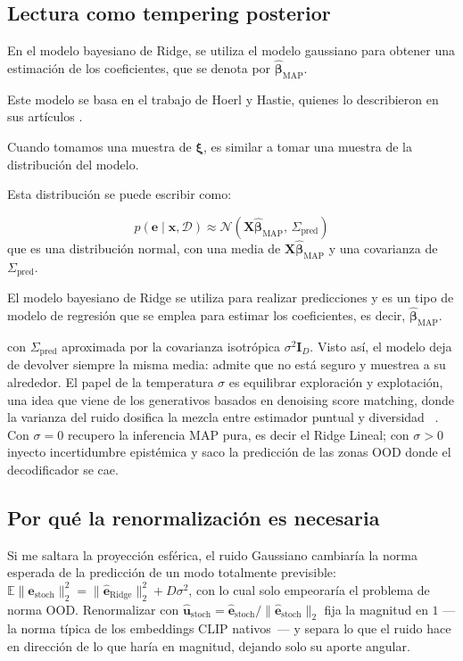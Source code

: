 \subsection{Lectura como tempering posterior}
En el modelo bayesiano de Ridge, se utiliza el modelo gaussiano para obtener una estimación de los coeficientes, que se denota por $\hat{\boldsymbol{\beta}}_{\text{MAP}}$.

Este modelo se basa en el trabajo de Hoerl y Hastie, quienes lo describieron en sus artículos \cite{hoerl1970ridge,hastie2009elements}.

Cuando tomamos una muestra de $\boldsymbol{\xi}$, es similar a tomar una muestra de la distribución del modelo.

Esta distribución se puede escribir como:

\begin{equation}
p(\mathbf{e}\!\mid\!\mathbf{x},\mathcal{D}) \approx \mathcal{N}\!\left(\mathbf{X}\hat{\boldsymbol{\beta}}_{\text{MAP}},\,\Sigma_{\text{pred}}\right)
\end{equation}
que es una distribución normal, con una media de $\mathbf{X}\hat{\boldsymbol{\beta}}_{\text{MAP}}$ y una covarianza de $\Sigma_{\text{pred}}$.

El modelo bayesiano de Ridge se utiliza para realizar predicciones y es un tipo de modelo de regresión que se emplea para estimar los coeficientes, es decir, $\hat{\boldsymbol{\beta}}_{\text{MAP}}$.

con $\Sigma_{\text{pred}}$ aproximada por la covarianza isotrópica $\sigma^2\mathbf{I}_D$. 
Visto así, el modelo deja de devolver siempre la misma media: admite que no está seguro y 
muestrea a su alrededor. El papel de la temperatura $\sigma$ es equilibrar exploración y 
explotación, una idea que viene de los generativos basados en denoising score matching, donde 
la varianza del ruido dosifica la mezcla entre estimador puntual y diversidad
~\cite{sohldickstein2015deep,ho2020ddpm}. Con $\sigma=0$ recupero la inferencia MAP pura, es 
decir el Ridge Lineal; con $\sigma>0$ inyecto incertidumbre epistémica y saco la predicción de 
las zonas OOD donde el decodificador se cae.

\subsection{Por qué la renormalización es necesaria}

Si me saltara la proyección esférica, el ruido Gaussiano cambiaría la norma esperada de la 
predicción de un modo totalmente previsible: $\mathbb{E}\|\hat{\mathbf{e}}_{\text{stoch}}\|_2^2 = \|\hat{\mathbf{e}}_{\text{Ridge}}\|_2^2 + D\sigma^2$, con lo cual solo empeoraría el problema de norma OOD. Renormalizar con $\hat{\mathbf{u}}_{\text{stoch}} = \hat{\mathbf{e}}_{\text{stoch}}/\|\hat{\mathbf{e}}_{\text{stoch}}\|_2$ fija la magnitud en $1$ ---la norma típica de los embeddings CLIP nativos~\cite{liang2022mind}--- y separa lo que el ruido hace en dirección de lo que haría en magnitud, dejando solo su aporte angular.


